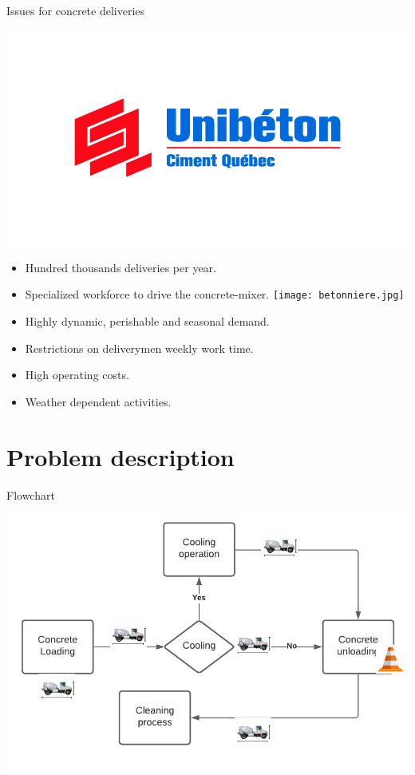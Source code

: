 \documentclass[9pt,xcolor={dvipsnames}]{beamer}
\begin{document}
\begin{frame}{Issues for concrete deliveries}
\begin{block}{ }
\includegraphics[scale=0.5]{Unibeton.jpg}
\begin{itemize}
\item Hundred thousands deliveries per year.
\item Specialized workforce to drive the concrete-mixer.
	\texttt{[image: betonniere.jpg]}
\vspace{0.1cm}
\item Highly dynamic, perishable and seasonal demand.
\item Restrictions on deliverymen weekly work time.
\item High operating costs.
\item Weather dependent activities.
\end{itemize}
\end{block}
\end{frame}


\section{Problem description}

\begin{frame}{Flowchart}

\includegraphics[scale=0.7]{flowchart.png}

\end{frame}
\end{document}
